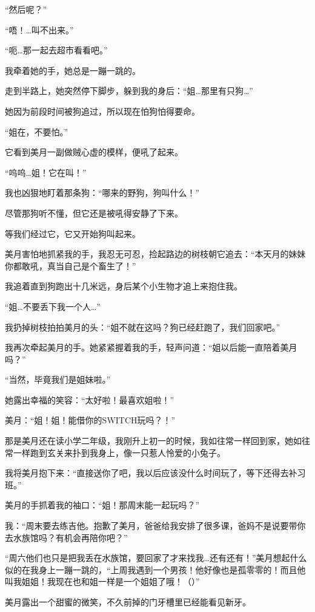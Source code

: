 “然后呢？”

“唔！…叫不出来。”

“呃…那一起去超市看看吧。”

我牵着她的手，她总是一蹦一跳的。

走到半路上，她突然停下脚步，躲到我的身后：“姐…那里有只狗…”

她因为前段时间被狗追过，所以现在怕狗怕得要命。

“姐在，不要怕。”

它看到美月一副做贼心虚的模样，便吼了起来。

“呜呜…姐！它在叫！”

我也凶狠地盯着那条狗：“哪来的野狗，狗叫什么！”

尽管那狗听不懂，但它还是被吼得安静了下来。

等我们经过它，它又开始狗叫起来。

美月害怕地抓紧我的手，我忍无可忍，捡起路边的树枝朝它追去：“本天月的妹妹你都敢吼，真当自己是个畜生了！”

我追着直到狗跑出十几米远，身后某个小生物才追上来抱住我。

“姐…不要丢下我一个人…”

我扔掉树枝拍拍美月的头：“姐不就在这吗？狗已经赶跑了，我们回家吧。”

我再次牵起美月的手。她紧紧握着我的手，轻声问道：“姐以后能一直陪着美月吗？”

“当然，毕竟我们是姐妹啦。”

她露出幸福的笑容：“太好啦！最喜欢姐啦！”

\cutlinesm

\newday{\cmoon}

美月：“姐！姐！能借你的SWITCH玩吗？！”

那是美月还在读小学二年级，我刚升上初一的时候，我如往常一样回到家，她如往常一样跑到玄关来扑到我身上，像一只惹人怜爱的小兔子。

我将美月抱下来：“直接送你了吧，我以后应该没什么时间玩了，等下还得去补习班。”

美月的手抓着我的袖口：“姐！那周末能一起玩吗？”

我：“周末要去练吉他。抱歉了美月，爸爸给我安排了很多课，爸妈不是说要带你去水族馆吗？有机会再陪你吧？”

“周六他们也只是把我丢在水族馆，要回家了才来找我…还有还有！”美月想起什么似的在我身上一蹦一跳的，“上周我遇到一个男孩！他好像也是孤零零的！而且他叫我姐姐！我现在也和姐一样是一个姐姐了哦！（）”

美月露出一个甜蜜的微笑，不久前掉的门牙槽里已经能看见新牙。

